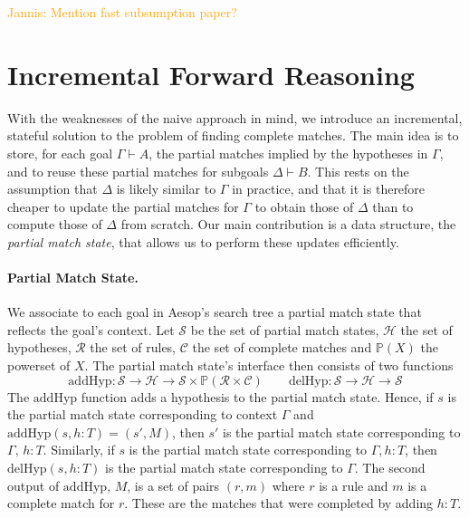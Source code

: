 \documentclass[runningheads]{llncs}
\newcommand{\jcom}[1]{{\textcolor{orange}{Jannis: #1}} }
\newcommand{\Rules}{\ensuremath{\mathcal{R}}}
\newcommand{\Hyps}{\ensuremath{\mathcal{H}}}
\newcommand{\States}{\ensuremath{\mathcal{S}}}
\newcommand{\CMatches}{\ensuremath{\mathcal{C}}}
\newcommand{\addHyp}{\ensuremath{\mathrm{addHyp}}}
\newcommand{\delHyp}{\ensuremath{\mathrm{delHyp}}}
\newcommand{\powerset}{\ensuremath{\mathbb{P}}}
\begin{document}
\jcom{Mention fast subsumption paper?}

\section{Incremental Forward Reasoning}%
\label{sec:incremental}

With the weaknesses of the naive approach in mind, we introduce an incremental, stateful solution to the problem of finding complete matches.
The main idea is to store, for each goal $Γ ⊢ A$, the partial matches implied by the hypotheses in $Γ$, and to reuse these partial matches for subgoals $Δ ⊢ B$.
This rests on the assumption that $Δ$ is likely similar to $Γ$ in practice, and that it is therefore cheaper to update the partial matches for $Γ$ to obtain those of $Δ$ than to compute those of $Δ$ from scratch.
Our main contribution is a data structure, the \emph{partial match state}, that allows us to perform these updates efficiently.

\paragraph{Partial Match State.}
We associate to each goal in Aesop's search tree a partial match state that reflects the goal's context.
Let $\States$ be the set of partial match states, $\Hyps$ the set of hypotheses, $\Rules$ the set of rules, $\CMatches$ the set of complete matches and $\powerset(X)$ the powerset of $X$.
The partial match state's interface then consists of two functions
\begin{equation*}
  \addHyp : \States → \Hyps → \States × \powerset(\Rules × \CMatches) \qquad \delHyp : \States → \Hyps → \States
\end{equation*}
The $\addHyp$ function adds a hypothesis to the partial match state.
Hence, if $s$ is the partial match state corresponding to context $Γ$ and $\addHyp(s, h : T) = (s', M)$, then $s'$ is the partial match state corresponding to $Γ,\, h : T$.
Similarly, if $s$ is the partial match state corresponding to $Γ, h : T$, then $\delHyp(s, h : T)$ is the partial match state corresponding to $Γ$.
The second output of $\addHyp$, $M$, is a set of pairs $(r, m)$ where $r$ is a rule and $m$ is a complete match for $r$.
These are the matches that were completed by adding $h : T$.
\end{document}

